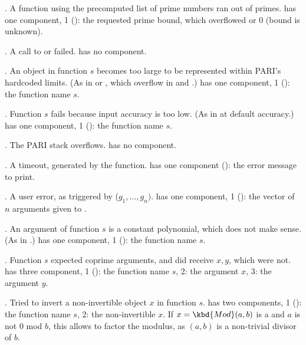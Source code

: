  \item {}. A function using the precomputed list of prime
 numbers ran out of primes.
  has one component, 1 (): the requested prime bound, which
 overflowed  or $0$ (bound is unknown).

 \item {}. A call to  or 
 failed.  has no component.

 \item {}. An object in function $s$ becomes too large to be
 represented within PARI's hardcoded limits. (As in  or
 , which overflow in  and .)
  has one component, 1 (): the function name $s$.

 \item {}. Function $s$ fails because input accuracy is too low.
 (As in  at default accuracy.)
  has one component, 1 (): the function name $s$.

 \item {}. The PARI stack overflows.
  has no component.


 \item {}. A timeout, generated by the  function.
  has one component (): the error message to print.

 \item {}. A user error, as triggered by
 ($g_1,\dots,g_n)$.
  has one component, 1 (): the vector of $n$ arguments given
 to .


 \item {}. An argument of function $s$ is a constant
 polynomial, which does not make sense. (As in .)
  has one component, 1 (): the function name $s$.

 \item {}. Function $s$ expected coprime arguments,
 and did receive $x,y$, which were not.
  has three component, 1 (): the function name $s$,
 2: the argument $x$, 3: the argument $y$.

 \item {}. Tried to invert a non-invertible object $x$ in
 function $s$.
  has two components, 1 (): the function name $s$,
 2: the non-invertible $x$. If $x = \kbd{Mod}(a,b)$
 is a  and $a$ is not $0$ mod $b$, this allows to factor
 the modulus, as $(a,b)$ is a non-trivial divisor of $b$.

